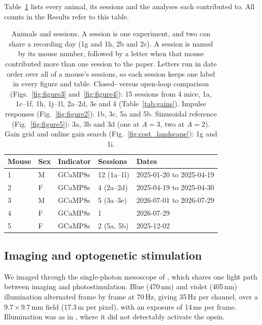 Table~\ref{tab:cohort} lists every animal, its sessions and the analyses each
contributed to. All counts in the Results refer to this table.

\begin{table}[h]
    \centering
    \small
    \begin{tabular}{lllll}
        \hline
        Mouse & Sex & Indicator & Sessions & Dates \\
        \hline
        1 & M & GCaMP8s & 12 (1a--1l) & 2025-01-20 to 2025-04-19 \\
        2 & F & GCaMP8s & 4 (2a--2d) & 2025-04-19 to 2025-04-30 \\
        3 & M & GCaMP8s & 5 (3a--3e) & 2026-07-01 to 2026-07-29 \\
        4 & F & GCaMP8s & 1 & 2026-07-29 \\
        5 & F & GCaMP8s & 2 (5a, 5b) & 2025-12-02 \\
        \hline
    \end{tabular}
    \caption{Animals and sessions. A session is one experiment, and two can share a recording
        day (1g and 1h, 2b and 2c). A session is named by its mouse number, followed by a letter
        when that mouse contributed more than one session to the paper. Letters run in date
        order over all of a mouse's sessions, so each session keeps one label in every figure
        and table. Closed- versus open-loop comparison (Figs.~\ref{fig:figure3}
        and~\ref{fig:figure4}): 15 sessions from 4 mice, 1a, 1c--1f, 1h, 1j--1l, 2a--2d, 3e
        and 4 (Table~\ref{tab:gains}). Impulse responses (Fig.~\ref{fig:figure2}): 1b, 3c, 5a
        and 5b. Sinusoidal reference (Fig.~\ref{fig:figure5}): 3a, 3b and 3d (one at $A = 3$,
        two at $A = 2$). Gain grid and online gain search (Fig.~\ref{fig:cost_landscape}): 1g
        and 1i.}
    \label{tab:cohort}
\end{table}

\subsection*{Imaging and optogenetic stimulation}

We imaged through the single-photon mesoscope of \citet{Matveev2024}, which
shares one light path between imaging and photostimulation. Blue (470\,nm) and
violet (405\,nm) illumination alternated frame by frame at 70\,Hz, giving 35\,Hz
per channel, over a $9.7 \times 9.7$\,mm field (17.3\,\textmu m per pixel),
with an exposure of 14\,ms per frame. Illumination was as in
\citet{Matveev2024}, where it did not detectably activate the opsin.

